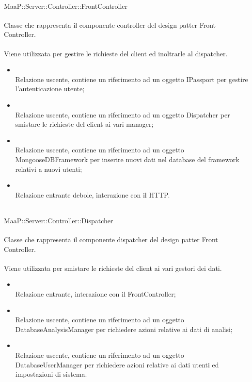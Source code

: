 \\
MaaP::Server::Controller::FrontController\\
\\
Classe che rappresenta il componente controller del design patter Front Controller.\\
\\
Viene utilizzata per gestire le richieste del client ed inoltrarle al dispatcher.\\
\begin{itemize}
\item{}\\
Relazione uscente, contiene un riferimento ad un oggetto IPassport per gestire l'autenticazione utente;
\item{}\\
Relazione uscente, contiene un riferimento ad un oggetto Dispatcher per smistare le richieste del client ai vari manager;
\item{}\\
Relazione uscente, contiene un riferimento ad un oggetto MongooseDBFramework per inserire nuovi dati nel database del framework relativi a nuovi utenti;
\item{}\\
Relazione entrante debole, interazione con il  HTTP.
\end{itemize}

\\
MaaP::Server::Controller::Dispatcher\\
\\
Classe che rappresenta il componente dispatcher del design patter Front Controller.\\
\\
Viene utilizzata per smistare le richieste del client ai vari gestori dei dati.\\
\begin{itemize}
\item{}\\
Relazione entrante, interazione con il FrontController;
\item{}\\
Relazione uscente, contiene un riferimento ad un oggetto DatabaseAnalysisManager per richiedere azioni relative ai dati di analisi;
\item{}\\
Relazione uscente, contiene un riferimento ad un oggetto DatabaseUserManager per richiedere azioni relative ai dati utenti ed impostazioni di sistema.
\end{itemize}


